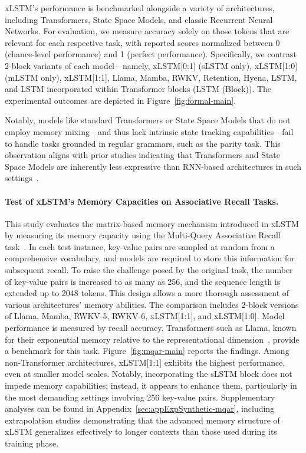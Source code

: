 xLSTM's performance is benchmarked alongside a variety of architectures, including Transformers, State Space Models, and classic Recurrent Neural Networks. For evaluation, we measure accuracy solely on those tokens that are relevant for each respective task, with reported scores normalized between 0 (chance-level performance) and 1 (perfect performance). Specifically, we contrast 2-block variants of each model—namely, xLSTM[0:1] (sLSTM only), xLSTM[1:0] (mLSTM only), xLSTM[1:1], Llama, Mamba, RWKV, Retention, Hyena, LSTM, and LSTM incorporated within Transformer blocks (LSTM (Block)). The experimental outcomes are depicted in Figure~\ref{fig:formal-main}.

Notably, models like standard Transformers or State Space Models that do not employ memory mixing—and thus lack intrinsic state tracking capabilities—fail to handle tasks grounded in regular grammars, such as the parity task. This observation aligns with prior studies indicating that Transformers and State Space Models are inherently less expressive than RNN-based architectures in such settings~\citep{Merrill:24, Merrill:23, Deletang:23}.

\paragraph{Test of xLSTM's Memory Capacities on Associative Recall Tasks.} This study evaluates the matrix-based memory mechanism introduced in xLSTM by measuring its memory capacity using the Multi-Query Associative Recall task~\citep{Arora:23arxiv}. In each test instance, key-value pairs are sampled at random from a comprehensive vocabulary, and models are required to store this information for subsequent recall. To raise the challenge posed by the original task, the number of key-value pairs is increased to as many as 256, and the sequence length is extended up to 2048 tokens. This design allows a more thorough assessment of various architectures' memory abilities. The comparison includes 2-block versions of Llama, Mamba, RWKV-5, RWKV-6, xLSTM[1:1], and xLSTM[1:0]. Model performance is measured by recall accuracy. Transformers such as Llama, known for their exponential memory relative to the representational dimension~\citep{Ramsauer:21}, provide a benchmark for this task. Figure~\ref{fig:mqar-main} reports the findings.
Among non-Transformer architectures, xLSTM[1:1] exhibits the highest performance, even at smaller model scales. Notably, incorporating the sLSTM block does not impede memory capabilities; instead, it appears to enhance them, particularly in the most demanding settings involving 256 key-value pairs. Supplementary analyses can be found in Appendix~\ref{sec:appExpSynthetic-mqar}, including extrapolation studies demonstrating that the advanced memory structure of xLSTM generalizes effectively to longer contexts than those used during its training phase.

